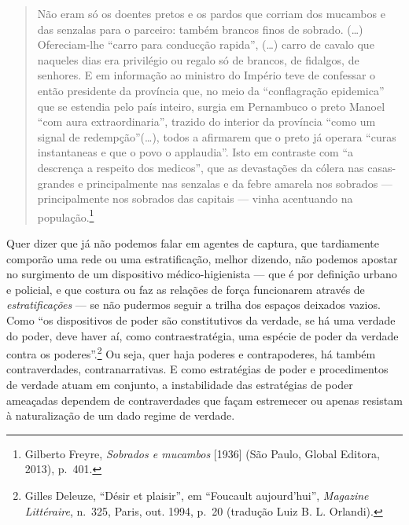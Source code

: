 \begin{quote}
Não eram só os doentes pretos e os pardos que corriam dos mucambos e das
senzalas para o parceiro: também brancos finos de sobrado. (\dots{})
Ofereciam-lhe ``carro para conducção rapida'', (\ldots{}) carro de
cavalo que naqueles dias era privilégio ou regalo só de brancos, de
fidalgos, de senhores. E em informação ao ministro do Império teve de
confessar o então presidente da província que, no meio da ``conflagração
epidemica'' que se estendia pelo país inteiro, surgia em Pernambuco o
preto Manoel ``com aura extraordinaria'', trazido do interior da
província ``como um signal de redempção''(\dots{}), todos a afirmarem que o
preto já operara ``curas instantaneas e que o povo o applaudia''. Isto
em contraste com ``a descrença a respeito dos medicos'', que as
devastações da cólera nas casas-grandes e principalmente nas senzalas e
da febre amarela nos sobrados --- principalmente nos sobrados das
capitais --- vinha acentuando na população.\footnote{Gilberto Freyre,
  \textit{Sobrados e mucambos} {[}1936{]} (São Paulo, Global Editora,
  2013), p.~401.}
\end{quote}

Quer dizer que já não podemos falar em agentes de captura, que
tardiamente comporão uma rede ou uma estratificação, melhor dizendo, não
podemos apostar no surgimento de um dispositivo médico-higienista --- que
é por definição urbano e policial, e que costura ou faz as relações de
força funcionarem através de \textit{estratificações} --- se não pudermos
seguir a trilha dos espaços deixados vazios. Como ``os dispositivos de
poder são constitutivos da verdade, se há uma verdade do poder, deve
haver aí, como contraestratégia, uma espécie de poder da verdade contra
os poderes''.\footnote{Gilles Deleuze, ``Désir et plaisir'', em
  ``Foucault aujourd'hui'', \textit{Magazine Littéraire}, n.~325, Paris,
  out. 1994, p.~20 (tradução Luiz B. L. Orlandi).} Ou seja, quer haja
poderes e contrapoderes, há também contraverdades, contranarrativas. E
como estratégias de poder e procedimentos de verdade atuam em conjunto,
a instabilidade das estratégias de poder ameaçadas dependem de
contraverdades que façam estremecer ou apenas resistam à naturalização
de um dado regime de verdade.

